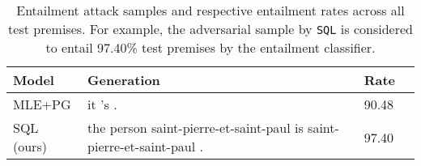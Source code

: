 
\begin{table}
\centering
\small
\begin{tabular}{@{}p{}|p{}lc@{}}
\toprule
Model & Generation                                                            & Rate \\
\midrule
MLE+PG    & it 's .                                                              & 90.48 \\
SQL (ours)  & the person saint-pierre-et-saint-paul is saint-pierre-et-saint-paul . & 97.40 \\
\bottomrule
\end{tabular}
\vspace{-5pt}
\caption{
Entailment attack samples and respective entailment rates across all test premises. For example, the adversarial sample by \texttt{SQL} is considered to entail 97.40\% test premises by the entailment classifier.
}
\label{table:entailment-attack-examples}
\end{table}
